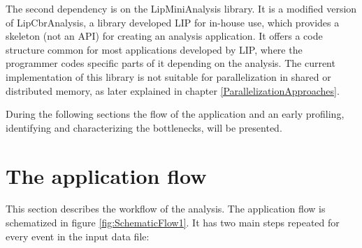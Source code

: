 The second dependency is on the LipMiniAnalysis library. It is a modified version of LipCbrAnalysis, a library developed LIP for in-house use, which provides a skeleton (not an API) for creating an analysis application. It offers a code structure common for most applications developed by LIP, where the programmer codes specific parts of it depending on the analysis. The current implementation of this library is not suitable for parallelization in shared or distributed memory, as later explained in chapter \ref{ParallelizationApproaches}.

During the following sections the flow of the application and an early profiling, identifying and characterizing the bottlenecks, will be presented.

\section{The \tth application flow}
\label{Application:Flow}

This section describes the workflow of the \tth analysis. The application flow is schematized in figure \ref{fig:SchematicFlow1}. It has two main steps repeated for every event in the input data file: 

